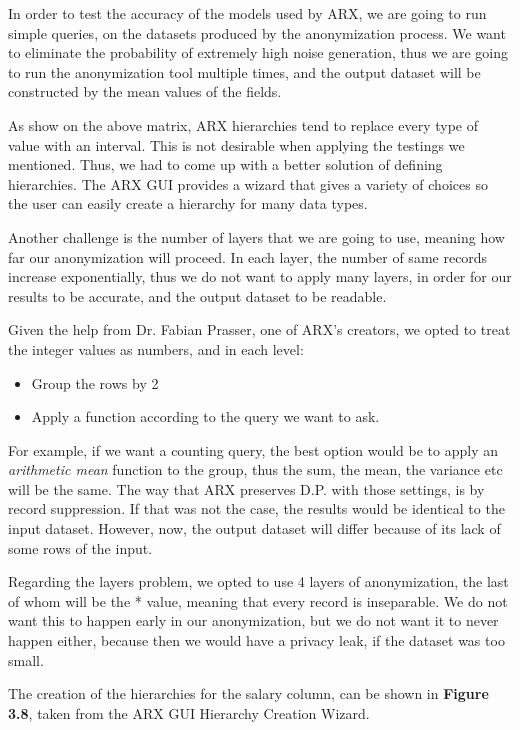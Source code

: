 In order to test the accuracy of the models used by ARX, we are going to run simple queries, on the datasets produced by the anonymization process. We want to eliminate the probability of extremely high noise generation, thus we are going to run the anonymization tool multiple times, and the output dataset will be constructed by the mean values of the fields.

As show on the above matrix, ARX hierarchies tend to replace every type of value with an interval. This is not desirable when applying the testings we mentioned. Thus, we had to come up with a better solution of defining hierarchies. The ARX GUI provides a wizard that gives a variety of choices so the user can easily create a hierarchy for many data types.

Another challenge is the number of layers that we are going to use, meaning how far our anonymization will proceed. In each layer, the number of same records increase exponentially, thus we do not want to apply many layers, in order for our results to be accurate, and the output dataset to be readable.

Given the help from Dr. Fabian Prasser, one of ARX's creators, we opted to treat the integer values as numbers, and in each level:
\begin{itemize}
    \item Group the rows by 2
    \item Apply a function according to the query we want to ask.
\end{itemize}
 
For example, if we want a counting query, the best option would be to apply an \emph{arithmetic mean} function to the group, thus the sum, the mean, the variance etc will be the same. The way that ARX preserves D.P. with those settings, is by record suppression. If that was not the case, the results would be identical to the input dataset. However, now, the output dataset will differ because of its lack of some rows of the input.
 
Regarding the layers problem, we opted to use 4 layers of anonymization, the last of whom will be the * value, meaning that every record is inseparable. We do not want this to happen early in our anonymization, but we do not want it to never happen either, because then we would have a privacy leak, if the dataset was too small.

The creation of the hierarchies for the salary column, can be shown in \textbf{Figure 3.8}, taken from the ARX GUI Hierarchy Creation Wizard.

